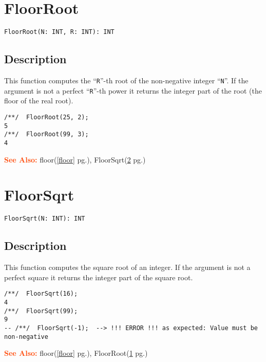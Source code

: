 \documentclass[a4paper]{mybook}
\newenvironment{command}{}{} %
\newcommand\SeeAlso{\par\textcolor{OrangeRed}{\textbf{\large See Also: }}}
\begin{document}
\section{FloorRoot}
\label{FloorRoot}
\begin{command} %


\begin{Verbatim}[label=syntax, rulecolor=\color{MidnightBlue},
frame=single]
FloorRoot(N: INT, R: INT): INT
\end{Verbatim}


\subsection*{Description}

This function computes the ``\verb&R&''-th root of the non-negative integer ``\verb&N&''.
If the argument is not a perfect ``\verb&R&''-th power it returns the integer
part of the root (the floor of the real root).
\begin{Verbatim}[label=example, rulecolor=\color{PineGreen}, frame=single]
/**/  FloorRoot(25, 2);
5
/**/  FloorRoot(99, 3);
4
\end{Verbatim}


\SeeAlso %
  floor(\ref{floor} pg.\pageref{floor}), 
    FloorSqrt(\ref{FloorSqrt} pg.\pageref{FloorSqrt})
\end{command} %

\section{FloorSqrt}
\label{FloorSqrt}
\begin{command} %


\begin{Verbatim}[label=syntax, rulecolor=\color{MidnightBlue},
frame=single]
FloorSqrt(N: INT): INT
\end{Verbatim}


\subsection*{Description}

This function computes the square root of an integer.  If the argument is
not a perfect square it returns the integer part of the square root.
\begin{Verbatim}[label=example, rulecolor=\color{PineGreen}, frame=single]
/**/  FloorSqrt(16);
4
/**/  FloorSqrt(99);
9
-- /**/  FloorSqrt(-1);  --> !!! ERROR !!! as expected: Value must be non-negative
\end{Verbatim}


\SeeAlso %
  floor(\ref{floor} pg.\pageref{floor}), 
    FloorRoot(\ref{FloorRoot} pg.\pageref{FloorRoot})
\end{command} %
\end{document}
